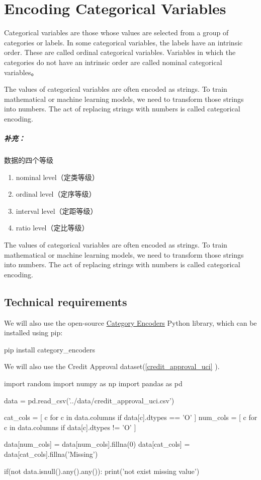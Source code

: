 \chapter{Encoding Categorical Variables}
Categorical variables are those whose values are selected from a group of categories or labels.  In some categorical variables, the labels have an intrinsic order. These are called ordinal categorical variables. Variables in which the categories do not have an intrinsic order are called nominal categorical variables。

The values of categorical variables are often encoded as strings. To train mathematical or machine learning models, we need to transform those strings into numbers. The act of replacing strings with numbers is called categorical encoding. 

\paragraph{补充：}数据的四个等级
\begin{enumerate}
    \item nominal level（定类等级）
    \item ordinal level（定序等级）
    \item interval level（定距等级）
    \item ratio level（定比等级）
\end{enumerate}

The values of categorical variables are often encoded as strings. To train mathematical or machine learning models, we need to transform those strings into numbers. The act of replacing strings with numbers is called categorical encoding. 

\section{Technical requirements}
We will also use the open-source \href{https://contrib.scikit-learn.org/category_encoders/}{Category Encoders} Python library, which can be installed using pip:
\begin{pyc}
pip install category_encoders
\end{pyc}

We will also use the Credit Approval dataset(\autoref{credit_approval_uci} ).

\begin{pyc}
import random
import numpy as np
import pandas as pd

data = pd.read_csv('../data/credit_approval_uci.csv')

cat_cols = [
    c for c in data.columns if data[c].dtypes == 'O'
]
num_cols = [
    c for c in data.columns if data[c].dtypes != 'O'
]

data[num_cols] = data[num_cols].fillna(0)
data[cat_cols] = data[cat_cols].fillna('Missing')

if(not data.isnull().any().any()):
    print('not exist missing value')
\end{pyc}
